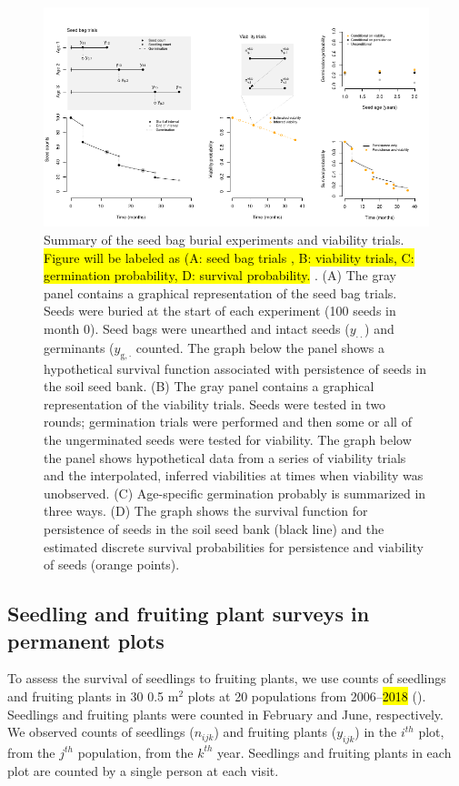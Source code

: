 \documentclass[12pt, oneside, titlepage]{article}   	%
\begin{document}
\begin{figure}[!h]
       \includegraphics[width=\textwidth]{../../manuscript/figures/seed-bag-figure.pdf}  
    \caption{ Summary of the seed bag burial experiments and viability trials. \hl{Figure will be labeled as (A: seed bag trials , B: viability trials, C: germination probability, D: survival probability. }. (A) The gray panel contains a graphical representation of the seed bag trials. Seeds were buried at the start of each experiment (100 seeds in month 0). Seed bags were unearthed and intact seeds ($y_{\cdot \cdot}$) and germinants ($y_{\mathrm{g},\cdot}$ counted. The graph below the panel shows a hypothetical survival function associated with persistence of seeds in the soil seed bank. (B) The gray panel contains a graphical representation of the viability trials. Seeds were tested in two rounds; germination trials were performed and then some or all of the ungerminated seeds were tested for viability. The graph below the panel shows hypothetical data from a series of viability trials and the interpolated, inferred viabilities at times when viability was unobserved. (C) Age-specific germination probably is summarized in three ways. (D) The graph shows the survival function for persistence of seeds in the soil seed bank (black line) and the estimated discrete survival probabilities for persistence and viability of seeds (orange points). }
 \label{fig:seed-bag-experiments}
\end{figure}

\subsection{Seedling and fruiting plant surveys in permanent plots}

To assess the survival of seedlings to fruiting plants, we use counts of seedlings and fruiting plants in 30 0.5 m$^2$ plots at 20 populations from 2006--\hl{2018} (\cite{eckhart2011}). Seedlings and fruiting plants were counted in February and June, respectively. We observed counts of seedlings ($n_{ijk}$) and fruiting plants ($y_{ijk}$) in the $i^{th}$ plot, from the $j^{th}$ population, from the $k^{th}$ year. Seedlings and fruiting plants in each plot are counted by a single person at each visit. 
\end{document}
